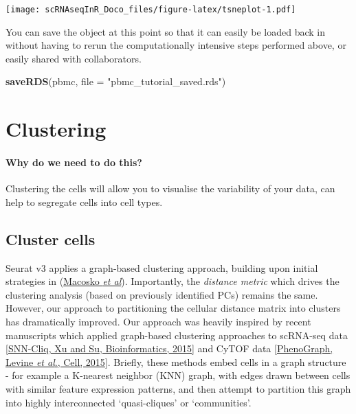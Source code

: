 \documentclass[
]{book}
\newenvironment{Shaded}{\begin{snugshade}}{\end{snugshade}}
\newcommand{\AttributeTok}[1]{\textcolor[rgb]{0.13,0.29,0.53}{#1}}
\newcommand{\FunctionTok}[1]{\textcolor[rgb]{0.13,0.29,0.53}{\textbf{#1}}}
\newcommand{\NormalTok}[1]{#1}
\newcommand{\StringTok}[1]{\textcolor[rgb]{0.31,0.60,0.02}{#1}}
\begin{document}
\texttt{[image: scRNAseqInR\_Doco\_files/figure-latex/tsneplot-1.pdf]}

You can save the object at this point so that it can easily be loaded back in without having to rerun the computationally intensive steps performed above, or easily shared with collaborators.

\begin{Shaded}
\begin{Highlighting}[]
\FunctionTok{saveRDS}\NormalTok{(pbmc, }\AttributeTok{file =} \StringTok{"pbmc\_tutorial\_saved.rds"}\NormalTok{) }
\end{Highlighting}
\end{Shaded}

\hypertarget{clustering}{%
\chapter{Clustering}\label{clustering}}

\hypertarget{why-do-we-need-to-do-this}{%
\subsubsection*{Why do we need to do this?}\label{why-do-we-need-to-do-this}}

Clustering the cells will allow you to visualise the variability of your data, can help to segregate cells into cell types.

\hypertarget{cluster-cells}{%
\section{Cluster cells}\label{cluster-cells}}

Seurat v3 applies a graph-based clustering approach, building upon initial strategies in (\href{http://www.cell.com/abstract/S0092-8674(15)00549-8}{Macosko \emph{et al}}). Importantly, the \emph{distance metric} which drives the clustering analysis (based on previously identified PCs) remains the same. However, our approach to partitioning the cellular distance matrix into clusters has dramatically improved. Our approach was heavily inspired by recent manuscripts which applied graph-based clustering approaches to scRNA-seq data \href{http://bioinformatics.oxfordjournals.org/content/early/2015/02/10/bioinformatics.btv088.abstract}{{[}SNN-Cliq, Xu and Su, Bioinformatics, 2015{]}} and CyTOF data \href{http://www.ncbi.nlm.nih.gov/pubmed/26095251}{{[}PhenoGraph, Levine \emph{et al}., Cell, 2015{]}}. Briefly, these methods embed cells in a graph structure - for example a K-nearest neighbor (KNN) graph, with edges drawn between cells with similar feature expression patterns, and then attempt to partition this graph into highly interconnected `quasi-cliques' or `communities'.
\end{document}
